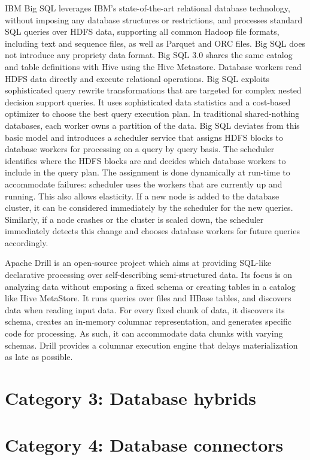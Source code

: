 \documentclass{vldb}
\begin{document}
IBM Big SQL \cite{bigsql} leverages IBM's state-of-the-art relational database technology, without imposing any database structures or restrictions, and processes standard SQL queries over HDFS data, supporting all common Hadoop file formats, including text and sequence files, as well as Parquet and ORC files. Big SQL does not introduce any propriety data format. Big SQL 3.0 shares the same catalog and table definitions with Hive using the Hive Metastore. Database workers read HDFS data directly and execute relational operations. Big SQL exploits sophisticated query rewrite transformations \cite{pirahesh96, winmagic} that are targeted for complex nested decision support queries. It uses sophisticated data statistics and a cost-based optimizer to choose the best query execution plan. In traditional shared-nothing databases, each worker owns a partition of the data. Big SQL deviates from this basic model and introduces a scheduler service that assigns HDFS blocks to database workers for processing on a query by query basis. The scheduler identifies where the HDFS blocks are and decides which database workers to include in the query plan. The assignment is done dynamically at run-time to accommodate failures: scheduler uses the workers that are currently up and running. This also allows elasticity. If a new node is added to the database cluster, it can be considered immediately by the scheduler for the new queries. Similarly, if a node crashes or the cluster is scaled down, the scheduler immediately detects this change and chooses database workers for future queries accordingly.

Apache Drill is an open-source project which aims at providing SQL-like declarative processing over self-describing semi-structured data. Its focus is on analyzing data without emposing a fixed schema or creating tables in a catalog like Hive MetaStore. It runs queries over files and HBase tables, and discovers data when reading input data. For every fixed chunk of data, it discovers its schema, creates an in-memory columnar representation, and generates specific code for processing. As such, it can accommodate data chunks with varying schemas. Drill provides a columnar execution engine that delays materialization as late as possible.

\section{Category 3: Database hybrids}

\section{Category 4: Database connectors}
\end{document}
